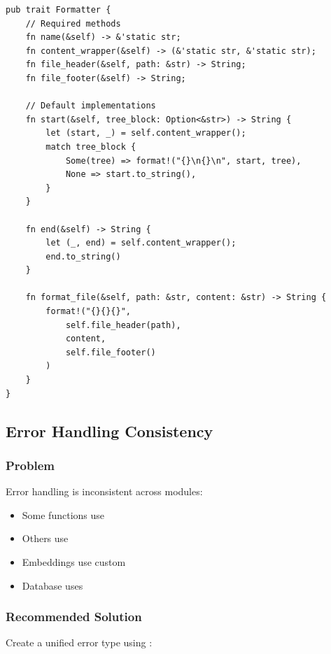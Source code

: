 \begin{lstlisting}[style=rustcode, caption={Formatter with default implementations}]
pub trait Formatter {
    // Required methods
    fn name(&self) -> &'static str;
    fn content_wrapper(&self) -> (&'static str, &'static str);
    fn file_header(&self, path: &str) -> String;
    fn file_footer(&self) -> String;
    
    // Default implementations
    fn start(&self, tree_block: Option<&str>) -> String {
        let (start, _) = self.content_wrapper();
        match tree_block {
            Some(tree) => format!("{}\n{}\n", start, tree),
            None => start.to_string(),
        }
    }
    
    fn end(&self) -> String {
        let (_, end) = self.content_wrapper();
        end.to_string()
    }
    
    fn format_file(&self, path: &str, content: &str) -> String {
        format!("{}{}{}", 
            self.file_header(path),
            content,
            self.file_footer()
        )
    }
}
\end{lstlisting}

\subsection{Error Handling Consistency}

\subsubsection{Problem}

Error handling is inconsistent across modules:
\begin{itemize}
    \item Some functions use 
    \item Others use 
    \item Embeddings use custom 
    \item Database uses 
\end{itemize}

\subsubsection{Recommended Solution}

Create a unified error type using :

